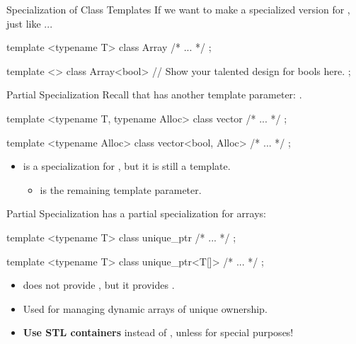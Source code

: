 \begin{frame}[fragile]{Specialization of Class Templates}
    If we want to make a specialized version for , just like ...
    \begin{cpp}
template <typename T>
class Array { /* ... */ };

template <>
class Array<bool> {
  // Show your talented design for bools here.
};
    \end{cpp}
\end{frame}

\begin{frame}[fragile]{Partial Specialization}
    Recall that  has another template parameter: .
    \begin{cpp}
template <typename T, typename Alloc>
class vector { /* ... */ };

template <typename Alloc>
class vector<bool, Alloc> { /* ... */ };
    \end{cpp}
    \pause
    \begin{itemize}
        \item {} is a specialization for , but it is still a template.
        \begin{itemize}
            \item {} is the remaining template parameter.
        \end{itemize}
    \end{itemize}
\end{frame}

\begin{frame}[fragile]{Partial Specialization}
     has a partial specialization for arrays:
    \begin{cpp}
template <typename T>
class unique_ptr { /* ... */ };

template <typename T>
class unique_ptr<T[]> { /* ... */ };
    \end{cpp}
    \begin{itemize}
        \item {} does not provide , but it provides .
        \item Used for managing dynamic arrays of unique ownership.
        \pause
        \item \textbf{Use STL containers} instead of , unless for special purposes!
    \end{itemize}
\end{frame}

